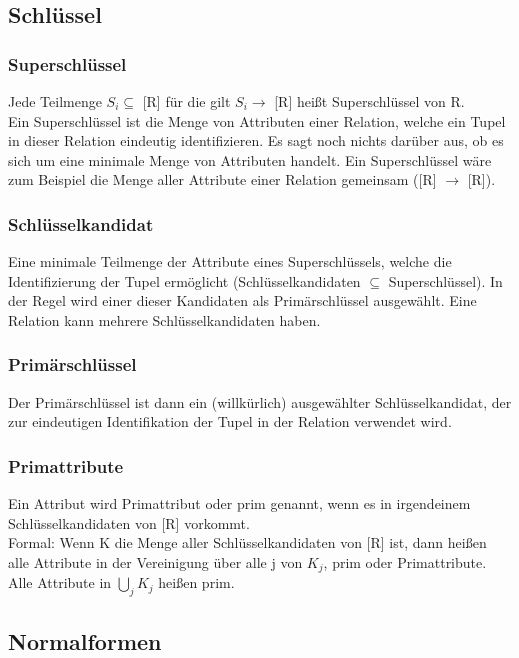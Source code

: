 \documentclass[12pt,a4paper]{article}
\begin{document}
	\subsection{Schlüssel}
		\subsubsection{Superschlüssel}
			Jede Teilmenge $S_i \subseteq$ [R] für die gilt $S_i \rightarrow$ [R] heißt Superschlüssel von R.\\
			Ein Superschlüssel ist die Menge von Attributen einer Relation, welche ein Tupel in dieser Relation eindeutig identifizieren. Es sagt noch nichts darüber aus, ob es sich um eine minimale Menge von Attributen handelt. Ein Superschlüssel wäre zum Beispiel die Menge aller Attribute einer Relation gemeinsam ([R] $\rightarrow$ [R]).
		
		\subsubsection{Schlüsselkandidat}
			Eine minimale Teilmenge der Attribute eines Superschlüssels, welche die Identifizierung der Tupel ermöglicht (Schlüsselkandidaten $\subseteq $ Superschlüssel). In der Regel wird einer dieser Kandidaten als Primärschlüssel ausgewählt. Eine Relation kann mehrere Schlüsselkandidaten haben. 

		\subsubsection{Primärschlüssel}
			Der Primärschlüssel ist dann ein (willkürlich) ausgewählter Schlüsselkandidat, der zur eindeutigen Identifikation der Tupel in der Relation verwendet wird. 

		\subsubsection{Primattribute}
			Ein Attribut wird Primattribut oder prim genannt, wenn es in irgendeinem Schlüsselkandidaten von [R] vorkommt.\\
			Formal: Wenn K die Menge aller Schlüsselkandidaten von [R] ist, dann heißen alle Attribute in der Vereinigung über alle j von $K_j$, prim oder Primattribute.
			Alle Attribute in $\bigcup_j K_j$ heißen prim.

	\subsection{Normalformen}
\end{document}
